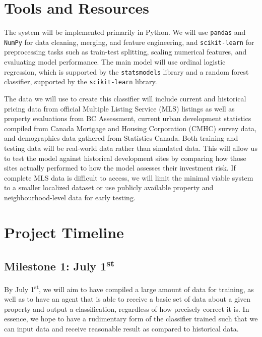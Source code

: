 \documentclass{article}
\begin{document}
\section*{Tools and Resources}
The system will be implemented primarily in Python. We will use \texttt{pandas} and \texttt{NumPy} for data cleaning, merging, and feature engineering, and \texttt{scikit-learn} for preprocessing tasks such as train-test splitting, scaling numerical features, and evaluating model performance. The main model will use ordinal logistic regression, which is supported by the \texttt{statsmodels} library and a random forest classifier, supported by the \texttt{scikit-learn} library. 


The data we will use to create this classifier will include current and historical pricing data from official Multiple Listing Service (MLS) listings as well as property evaluations from BC Assessment, current urban development statistics compiled from Canada Mortgage and Housing Corporation (CMHC) survey data, and demographics data gathered from Statistics Canada. Both training and testing data will be real-world data rather than simulated data. This will allow us to test the model against historical development sites by comparing how those sites actually performed to how the model assesses their investment risk. If complete MLS data is difficult to access, we will limit the minimal viable system to a smaller localized dataset or use publicly available property and neighbourhood-level data for early testing.

\section*{Project Timeline}

\subsection*{Milestone 1: July 1\textsuperscript{st}}

By July 1\textsuperscript{st}, we will aim to have compiled a large amount of data for training, as well as to have an agent that is able to receive a basic set of data about a given property and output a classification, regardless of how precisely correct it is. In essence, we hope to have a rudimentary form of the classifier trained such that we can input data and receive reasonable result as compared to historical data.
\end{document}

